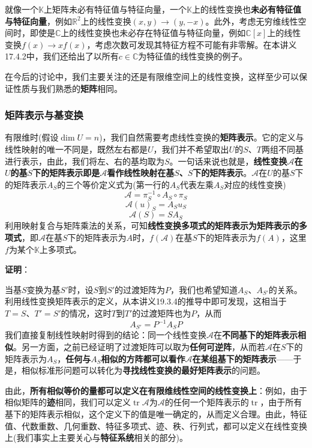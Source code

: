 \documentclass[a4paper,UTF8,fontset=windows,AutoFakeBold]{ctexart}
\DeclareMathOperator{\tr}{tr}
\newcommand*{\ma}{\mathcal{A}}
\newcommand{\proo}[1]{{\vspace{5pt}\kaishu\noindent\textbf{证明}：\vspace{-3pt}
\begin{compactitem}
    \item[] #1
\end{compactitem}
}}
\begin{document}
就像一个$\mathbb{K}$上矩阵未必有特征值与特征向量，一个$\mathbb{K}$上的线性变换也\textbf{未必有特征值与特征向量}，例如$\mathbb{R}^2$上的线性变换$(x,y)\to(y,-x)$。此外，考虑无穷维线性空间时，即使是$\mathbb{C}$上的线性变换也未必存在特征值与特征向量，例如$\mathbb{C}[x]$上的线性变换$f(x)\to xf(x)$，考虑次数可发现其特征方程不可能有非零解。在本讲义17.4.2中，我们还给出了以所有$c\in\mathbb{C}$为特征值的线性变换的例子。

在今后的讨论中，我们主要关注的还是有限维空间上的线性变换，这样至少可以保证性质与我们熟悉的\textbf{矩阵}相同。

\subsubsection{矩阵表示与基变换}
有限维时(假设$\dim U=n$)，我们自然需要考虑线性变换的\textbf{矩阵表示}。它的定义与线性映射的唯一不同是，既然左右都是$U$，我们并不希望取出$U$的$S$、$T$两组不同基进行表示，由此，我们将左、右的基均取为$S$。一句话来说也就是，\textbf{线性变换$\ma$在$U$的基$S$下的矩阵表示即是$\ma$看作线性映射在基$S$、$S$下的矩阵表示}。$\ma$在$U$的基$S$下的矩阵表示$A_S$的三个等价定义式为(第一行的$A_S$代表左乘$A_S$对应的线性变换)
$$\ma=\pi_S^{-1}\circ A_S\circ\pi_S$$
$$\ma(u)_S=A_Su_S$$
$$\ma(S)=SA_S$$
利用映射复合与矩阵乘法的关系，可知\textbf{线性变换多项式的矩阵表示为矩阵表示的多项式}，即$\ma$在基$S$下的矩阵表示为$A$时，$f(\ma)$在基$S$下的矩阵表示为$f(A)$，这里$f$为某个$\mathbb{K}$上多项式。

\proo{

}

当基$S$变换为基$S'$时，设$S$到$S'$的过渡矩阵为$P$，我们也希望知道$A_S$、$A_{S'}$的关系。利用线性变换矩阵表示的定义，从本讲义19.3.4的推导中即可发现，这相当于$T=S$、$T'=S'$的情况，这时$T$到$T'$的过渡矩阵也为$P$，从而
$$A_{S'}=P^{-1}A_SP$$
我们直接复制线性映射时得到的结论：同一个线性变换$\ma$在\textbf{不同基下的矩阵表示相似}。另一方面，之前已经证明了过渡矩阵可以取为\textbf{任何可逆阵}，从而若$\ma$在$S$下的矩阵表示为$A_S$，\textbf{任何与$A_S$相似的方阵都可以看作$\ma$在某组基下的矩阵表示}——于是，相似标准形问题可以转化为\textbf{寻找线性变换的最好矩阵表示}的问题。

由此，\textbf{所有相似等价的量都可以定义在有限维线性空间的线性变换上}：例如，由于相似矩阵的\textbf{迹}相同，我们可以定义$\tr\ma$为$\ma$的任何一个矩阵表示的$\tr$，由于所有基下的矩阵表示相似，这个定义下的值是唯一确定的，从而定义合理。由此，特征值、代数重数、几何重数、特征多项式、迹、秩、行列式，都可以定义在线性变换上(我们事实上主要关心与\textbf{特征系统}相关的部分)。
\end{document}
